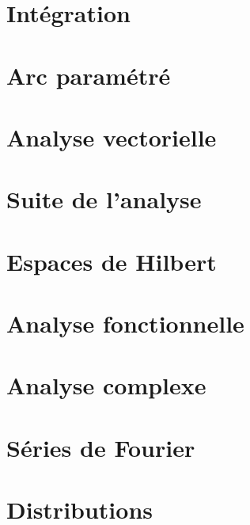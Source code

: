\chapter{Intégration}






\chapter{Arc paramétré}


\chapter{Analyse vectorielle}



\chapter{Suite de l'analyse}







\chapter{Espaces de Hilbert}


\chapter{Analyse fonctionnelle}



\chapter{Analyse complexe}          \label{ChapICHIooXbLccl}




\chapter{Séries de Fourier}



\chapter{Distributions}


